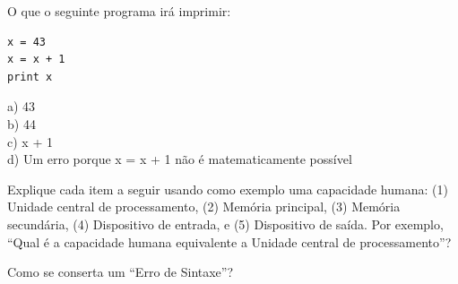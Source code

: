 \begin{ex}
O que o seguinte programa irá imprimir:

\beforeverb
\begin{verbatim}
x = 43
x = x + 1
print x
\end{verbatim}
\afterverb
%
a) 43\\
b) 44\\
c) x + 1\\
d) Um erro porque x = x + 1 não é matematicamente possível
\end{ex}
%
%

\begin{ex}
Explique cada item a seguir usando como exemplo uma capacidade humana:
(1) Unidade central de processamento, (2) Memória principal, (3) Memória secundária,
(4) Dispositivo de entrada, e
(5) Dispositivo de saída.
Por exemplo, ``Qual é a capacidade humana equivalente a Unidade central de processamento''?
\end{ex}
%

\begin{ex}
Como se conserta um ``Erro de Sintaxe''?
\end{ex}
%
%
